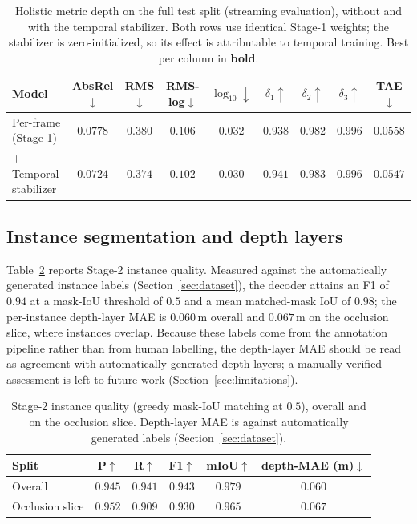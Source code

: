 \documentclass[sigconf, review=true]{acmart}
\begin{document}
\begin{table}[t]
\centering
\caption{Holistic metric depth on the full test split (streaming evaluation),
without and with the temporal stabilizer. Both rows use identical Stage-1
weights; the stabilizer is zero-initialized, so its effect is attributable to
temporal training. Best per column in \textbf{bold}.}
\label{tab:depth}
\begin{tabular}{lcccccccc}
\toprule
Model & AbsRel$\downarrow$ & RMS$\downarrow$ & RMS-log$\downarrow$ &
$\log_{10}\downarrow$ & $\delta_1\uparrow$ & $\delta_2\uparrow$ &
$\delta_3\uparrow$ & TAE$\downarrow$ \\
\midrule
Per-frame (Stage 1)      & $0.0778$ & $0.380$ & $0.106$ & $0.032$ & $0.938$ & $0.982$ & $0.996$ & $0.0558$ \\
\;\;+ Temporal stabilizer & $\mathbf{0.0724}$ & $\mathbf{0.374}$ & $\mathbf{0.102}$ & $\mathbf{0.030}$ & $\mathbf{0.941}$ & $\mathbf{0.983}$ & $0.996$ & $\mathbf{0.0547}$ \\
\bottomrule
\end{tabular}
\end{table}

\subsection{Instance segmentation and depth layers}
Table~\ref{tab:instance} reports Stage-2 instance quality. Measured against the
automatically generated instance labels (Section~\ref{sec:dataset}), the decoder
attains an F1 of $0.94$ at a mask-IoU threshold of $0.5$ and a mean matched-mask
IoU of $0.98$; the per-instance depth-layer MAE is $0.060\,$m overall and
$0.067\,$m on the occlusion slice, where instances overlap. Because these labels
come from the annotation pipeline rather than from human labelling, the
depth-layer MAE should be read as agreement with automatically generated depth
layers; a manually verified assessment is left to future work
(Section~\ref{sec:limitations}).

\begin{table}[t]
\centering
\caption{Stage-2 instance quality (greedy mask-IoU matching at $0.5$), overall
and on the occlusion slice. Depth-layer MAE is against automatically generated
labels (Section~\ref{sec:dataset}).}
\label{tab:instance}
\begin{tabular}{lccccc}
\toprule
Split & P$\uparrow$ & R$\uparrow$ & F1$\uparrow$ & mIoU$\uparrow$ & depth-MAE (m)$\downarrow$ \\
\midrule
Overall         & $0.945$ & $0.941$ & $0.943$ & $0.979$ & $0.060$ \\
Occlusion slice & $0.952$ & $0.909$ & $0.930$ & $0.965$ & $0.067$ \\
\bottomrule
\end{tabular}
\end{table}
\end{document}
